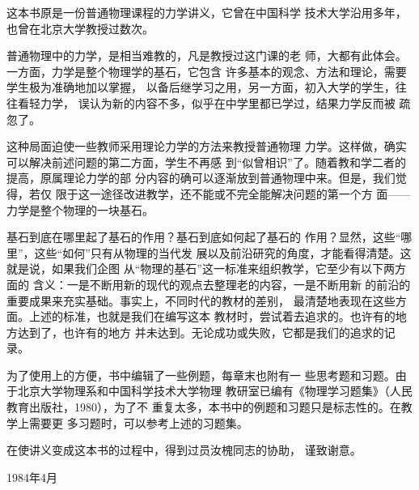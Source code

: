 \documentclass[../outline-of-mechanics.tex]{subfiles}
\begin{document}
\setcounter{page}{1}
\pagestyle{foreword}
\null\vspace{1em}
\begin{center}
  \label{foreword}

  \null{}
\end{center}
\fangsong\normalsize

这本书原是一份普通物理课程的力学讲义，它曾在中国科学
技术大学沿用多年，也曾在北京大学教授过数次。

普通物理中的力学，是相当难教的，凡是教授过这门课的老
师，大都有此体会。一方面，力学是整个物理学的基石，它包含
许多基本的观念、方法和理论，需要学生极为准确地加以掌握，
以备后继学习之用，另一方面，初入大学的学生，往往看轻力学，
误认为新的内容不多，似乎在中学里都已学过，结果力学反而被
疏忽了。

这种局面迫使一些教师采用理论力学的方法来教授普通物理
力学。这样做，确实可以解决前述问题的第二方面，学生不再感
到“似曾相识”了。随着教和学二者的提高，原属理论力学的部
分内容的确可以逐渐放到普通物理中来。但是，我们觉得，若仅
限于这一途径改进教学，还不能或不完全能解决问题的第一个方
面——力学是整个物理的一块基石。

基石到底在哪里起了基石的作用？基石到底如何起了基石的
作用？显然，这些“哪里”，这些“如何”只有从物理的当代发
展以及前沿研究的角度，才能看得清楚。这就是说，如果我们企图
从“物理的基石”这一标准来组织教学，它至少有以下两方面的
含义：一是不断用新的现代的观点去整理老的内容，一是不断用新
的前沿的重要成果来充实基础。事实上，不同时代的教材的差别，
最清楚地表现在这些方面。上述的标准，也就是我们在编写这本
教材时，尝试着去追求的。也许有的地方达到了，也许有的地方%
并未达到。无论成功或失败，它都是我们的追求的记录。

为了使用上的方便，书中编辑了一些例题，每章末也附有一
些思考题和习题。由于北京大学物理系和中国科学技术大学物理
教研室已编有《物理学习题集》（人民教育出版社，1980），为了不
重复太多，本书中的例题和习题只是标志性的。在教学上需要更
多习题时，可以参考上述的习题集。

在使讲义变成这本书的过程中，得到过员汝槐同志的协助，
谨致谢意。

\null{}

\hspace{6.8cm}

\mbox{}

\hspace{7cm}\normalfont{} 1984年4月\normalsize
\clearpage
\end{document}
